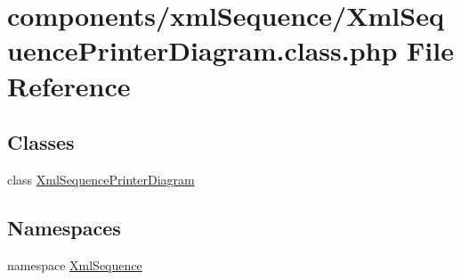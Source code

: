 \hypertarget{_xml_sequence_printer_diagram_8class_8php}{
\section{components/xmlSequence/XmlSequencePrinterDiagram.class.php File Reference}
\label{_xml_sequence_printer_diagram_8class_8php}
}
\subsection*{Classes}
\begin{CompactItemize}
\item 
class \hyperlink{class_xml_sequence_printer_diagram}{XmlSequencePrinterDiagram}
\end{CompactItemize}
\subsection*{Namespaces}
\begin{CompactItemize}
\item 
namespace \hyperlink{namespace_xml_sequence}{XmlSequence}
\end{CompactItemize}
